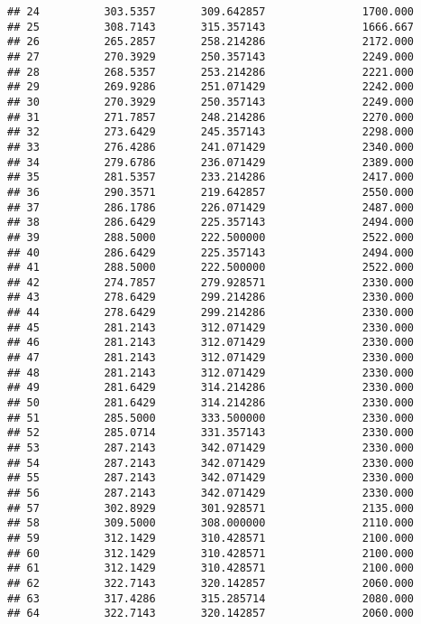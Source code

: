 \documentclass[]{article}
\begin{document}
\begin{verbatim}
## 24          303.5357       309.642857               1700.000
## 25          308.7143       315.357143               1666.667
## 26          265.2857       258.214286               2172.000
## 27          270.3929       250.357143               2249.000
## 28          268.5357       253.214286               2221.000
## 29          269.9286       251.071429               2242.000
## 30          270.3929       250.357143               2249.000
## 31          271.7857       248.214286               2270.000
## 32          273.6429       245.357143               2298.000
## 33          276.4286       241.071429               2340.000
## 34          279.6786       236.071429               2389.000
## 35          281.5357       233.214286               2417.000
## 36          290.3571       219.642857               2550.000
## 37          286.1786       226.071429               2487.000
## 38          286.6429       225.357143               2494.000
## 39          288.5000       222.500000               2522.000
## 40          286.6429       225.357143               2494.000
## 41          288.5000       222.500000               2522.000
## 42          274.7857       279.928571               2330.000
## 43          278.6429       299.214286               2330.000
## 44          278.6429       299.214286               2330.000
## 45          281.2143       312.071429               2330.000
## 46          281.2143       312.071429               2330.000
## 47          281.2143       312.071429               2330.000
## 48          281.2143       312.071429               2330.000
## 49          281.6429       314.214286               2330.000
## 50          281.6429       314.214286               2330.000
## 51          285.5000       333.500000               2330.000
## 52          285.0714       331.357143               2330.000
## 53          287.2143       342.071429               2330.000
## 54          287.2143       342.071429               2330.000
## 55          287.2143       342.071429               2330.000
## 56          287.2143       342.071429               2330.000
## 57          302.8929       301.928571               2135.000
## 58          309.5000       308.000000               2110.000
## 59          312.1429       310.428571               2100.000
## 60          312.1429       310.428571               2100.000
## 61          312.1429       310.428571               2100.000
## 62          322.7143       320.142857               2060.000
## 63          317.4286       315.285714               2080.000
## 64          322.7143       320.142857               2060.000

\end{verbatim}
\end{document}
